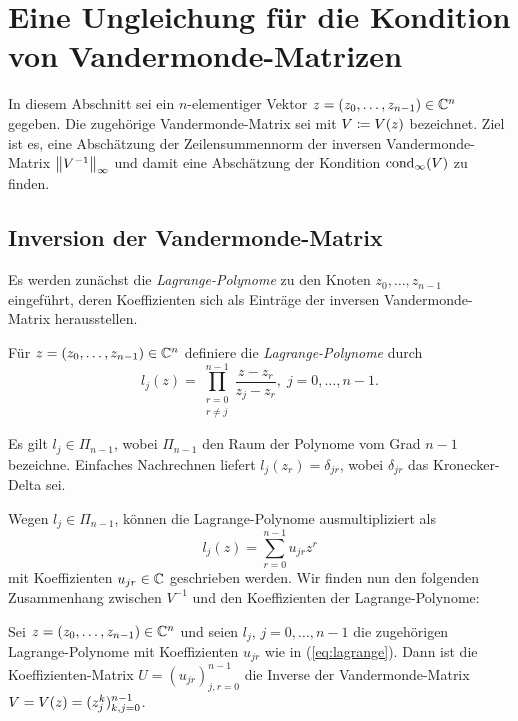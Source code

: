 \chapter{Eine Ungleichung für die Kondition von Vandermonde-Matrizen}
In diesem Abschnitt sei ein $n$-elementiger Vektor $z = (z_0, \dots, z_{n-1})
\in \Cn$ gegeben.  Die zugehörige Vandermonde-Matrix sei mit $V \defeq
\Vand{z}$ bezeichnet.  Ziel ist es, eine Abschätzung der Zeilensummennorm der
inversen Vandermonde-Matrix $\norm{V^{-1}}_{\infty}$ und damit eine Abschätzung der
Kondition $\cond[\infty]{V}$ zu finden.


\section{Inversion der Vandermonde-Matrix}
Es werden zunächst die \emph{Lagrange-Polynome} zu den Knoten
$z_0, \dots, z_{n-1}$ eingeführt, deren Koeffizienten sich als Einträge der
inversen Vandermonde-Matrix herausstellen.

\begin{mydef}
    Für $ z = (z_0, \dots, z_{n-1}) \in \Cn $ definiere die
    \emph{Lagrange-Polynome} durch
    \[
        l_j(z) = \prod_{\substack{r=0\\ r \neq j}}^{n-1} \frac{z - z_r}{z_j - z_r}, \; j = 0, \dots, n-1.
    \]
\end{mydef}

\begin{remark}
    Es gilt $l_j \in \Pi_{n-1}$, wobei $\Pi_{n-1}$ den Raum der Polynome vom
    Grad $n-1$ bezeichne.  Einfaches Nachrechnen liefert
    $l_j(z_r) = \delta_{jr}$, wobei $\delta_{jr}$ das Kronecker-Delta
    sei.
\end{remark}

Wegen $l_j \in \Pi_{n-1}$, können die Lagrange-Polynome ausmultipliziert als
\begin{equation}
    \label{eq:lagrange}
    l_j(z) = \sum_{r = 0}^{n-1} u_{jr} z^{r}
\end{equation}
mit Koeffizienten $u_{jr} \in \C$ geschrieben werden.
Wir finden nun den folgenden Zusammenhang zwischen $V^{-1}$ und den
Koeffizienten der Lagrange-Polynome:

\begin{lemma}
    \label{lemma:vandermonde-inversion}
    Sei $z = (z_0, \dots, z_{n-1}) \in \Cn$ und seien
    $l_j$, $j = 0, \dots, n-1$ die zugehörigen Lagrange-Polynome
    mit Koeffizienten $u_{jr}$ wie in (\ref{eq:lagrange}).
    Dann ist die Koeffizienten-Matrix $U = (u_{jr})_{j,r = 0}^{n-1}$ die
    Inverse der Vandermonde-Matrix $V = \Vand{z} = (z_{j}^{k})_{k,j = 0}^{n-1}$.
\end{lemma}


